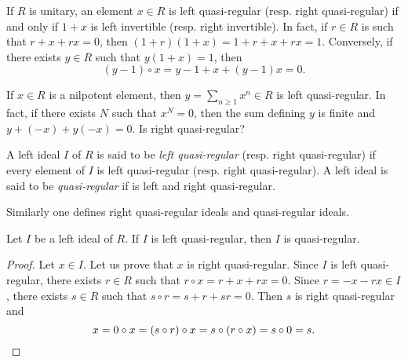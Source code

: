
If $R$ is unitary, an element $x\in R$ is left quasi-regular (resp. right quasi-regular)
if and only if $1+x$ is left invertible (resp. right invertible). In fact, 
if $r\in R$ is such that $r+x+rx=0$, then $(1+r)(1+x)=1+r+x+rx=1$.
Conversely, if there exists $y\in R$ such that $y(1+x)=1$, then  
\[
(y-1)\circ x=y-1+x+(y-1)x=0.
\]

\begin{example}
	If $x\in R$ is a nilpotent element, 
    then $y=\sum_{n\geq1}x^n\in R$ is left quasi-regular. 
	In fact, if there exists $N$ such that $x^N=0$, 
    then the sum defining $y$ is finite 
    and $y+(-x)+y(-x)=0$.  Is right quasi-regular?
\end{example}

\begin{definition}
A left ideal $I$ of $R$ is said to be 
\emph{left quasi-regular} (resp. right quasi-regular) if every element of $I$ is
left quasi-regular (resp. right quasi-regular). A left ideal 
is said to be \emph{quasi-regular} if is left and right quasi-regular. 
\end{definition}

Similarly 
one defines right quasi-regular ideals and quasi-regular ideals. 

\begin{lemma}
	\label{lemma:casiregular}
	Let $I$ be a left ideal of $R$. If $I$ is left quasi-regular, then 
	$I$ is quasi-regular.
\end{lemma}

\begin{proof}
	Let $x\in I$. Let us prove that $x$ is right quasi-regular. Since $I$ is
	left quasi-regular, there exists $r\in R$ such that $r\circ x=r+x+rx=0$. Since 
	$r=-x-rx\in I$, there exists $s\in R$ such that $s\circ
	r=s+r+sr=0$. Then $s$ is right quasi-regular and  
	\[
	x=0\circ x=(s\circ r)\circ x=s\circ (r\circ x)=s\circ 0=s.\qedhere
	\]
\end{proof}

